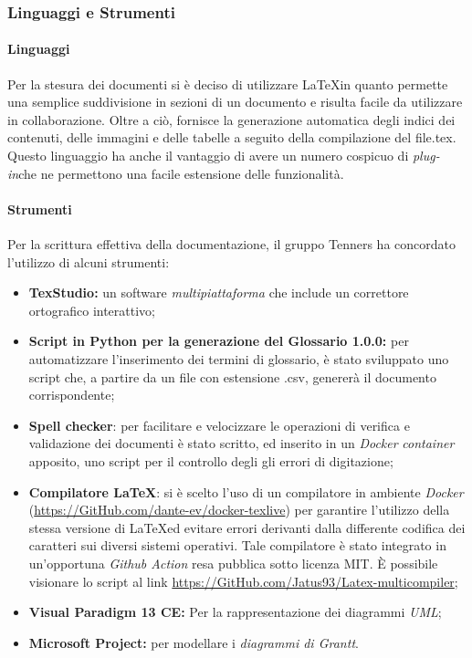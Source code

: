 \subsubsection{Linguaggi e Strumenti}
\paragraph{Linguaggi}
Per la stesura dei documenti si è deciso di utilizzare \LaTeX \space in quanto permette una semplice suddivisione in sezioni di un documento e risulta facile da utilizzare in collaborazione. Oltre a ciò, fornisce la generazione automatica degli indici dei contenuti, delle immagini e delle tabelle a seguito della compilazione del file.tex. Questo linguaggio ha anche il vantaggio di avere un numero cospicuo di \textit{plug-in}\glo che ne permettono una facile estensione delle funzionalità.

\paragraph{Strumenti}
Per la scrittura effettiva della documentazione, il gruppo Tenners ha concordato l'utilizzo di alcuni strumenti:
\begin{itemize}
	\item \textbf{TexStudio:} un software \textit{multipiattaforma\glo} che include un correttore ortografico interattivo;
	\item \textbf{Script in Python per la generazione del Glossario 1.0.0\docs:} per automatizzare l'inserimento dei termini di glossario, è stato sviluppato uno script che, a partire da un file con estensione .csv, genererà il documento corrispondente;
	\item \textbf{Spell checker}: per facilitare e velocizzare le operazioni di verifica e validazione dei documenti è
	stato scritto, ed inserito in un \textit{Docker\glo} \textit{container\glo} apposito, uno script per il controllo degli gli errori di digitazione;
	\item \textbf{Compilatore \LaTeX}: si è scelto l'uso di un compilatore in ambiente\textit{ Docker\glo} (\url{https://GitHub.com/dante-ev/docker-texlive}) per garantire l'utilizzo della stessa versione di \LaTeX ed evitare errori derivanti dalla differente codifica dei caratteri sui diversi sistemi operativi. Tale compilatore è stato integrato in un'opportuna \textit{Github Action\glo} resa pubblica sotto licenza MIT. È possibile visionare lo script al link \url{https://GitHub.com/Jatus93/Latex-multicompiler};
	\item \textbf{Visual Paradigm 13 CE:} Per la rappresentazione dei diagrammi \textit{UML\glos};
	\item \textbf{Microsoft Project:} per modellare i \textit{diagrammi di Grantt\glos}.
\end{itemize} 

